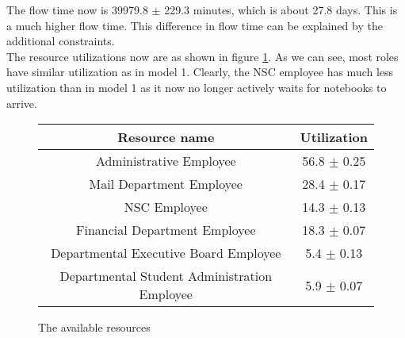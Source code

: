 The flow time now is 39979.8 $\pm$ 229.3 minutes, which is about 27.8 days. This is a much higher flow time. This difference in flow time can be explained by the additional constraints.\\

The resource utilizations now are as shown in figure \ref{fig:resourcesutil2}. As we can see, most roles have similar utilization as in model 1. Clearly, the NSC employee has much less utilization than in model 1 as it now no longer actively waits for notebooks to arrive.\\

\begin{figure}[h!]
\centering
\begin{tabular}{ | c | c | }
	\hline
	\textbf{Resource name} & \textbf{Utilization} \\ \hline\hline
	Administrative Employee & 56.8 $\pm$ 0.25 \\ \hline		
	Mail Department Employee & 28.4 $\pm$ 0.17 \\ \hline
	NSC Employee & 14.3 $\pm$ 0.13 \\ \hline
	Financial Department Employee & 18.3 $\pm$ 0.07 \\ \hline
	Departmental Executive Board Employee & 5.4 $\pm$ 0.13 \\ \hline
	Departmental Student Administration Employee & 5.9 $\pm$ 0.07 \\ \hline
	\hline
\end{tabular}
\caption{The available resources}
\label{fig:resourcesutil2}
\end{figure}
